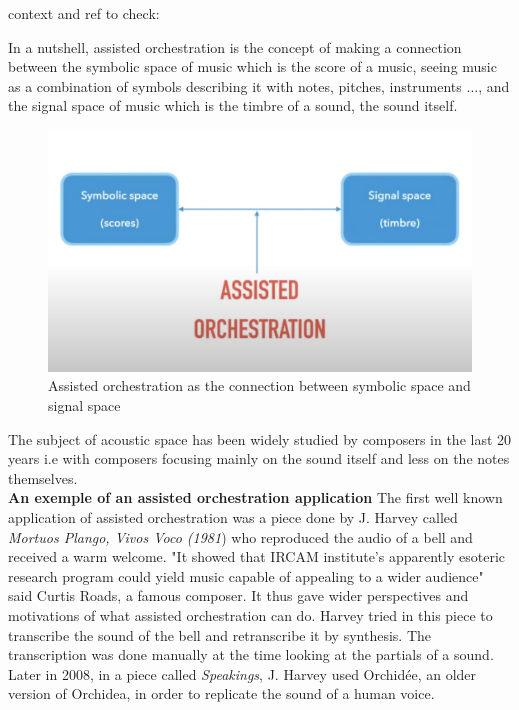 \documentclass[a4paper]{book}
\begin{document}
context and ref to check: \cite{maresz2013computer}

In a nutshell, assisted orchestration is the concept of making a connection between the symbolic space of music which is the score of a music, seeing music as a combination of symbols describing it with notes, pitches, instruments $\ldots$, and the signal space of music which is the timbre of a sound, the sound itself. 

\begin{figure}[h!]
\centering
\includegraphics[scale=0.3]{assistedorch.png}
\caption{Assisted orchestration as the connection between symbolic space and signal space}
\label{figassistedorch}
\end{figure}

The subject of acoustic space has been widely studied by composers in the last 20 years i.e with composers focusing mainly on the sound itself and less on the notes themselves.  \\

\textbf{An exemple of an assisted orchestration application }
The first well known application of assisted orchestration was a piece done by J. Harvey called \textit{Mortuos Plango, Vivos Voco (1981}) who reproduced the audio of a bell and received a warm welcome. "It showed that IRCAM institute's apparently esoteric research program could yield music capable of appealing to a wider audience" said Curtis Roads, a famous composer. It thus gave wider perspectives and motivations of what assisted orchestration can do. Harvey tried in this piece to transcribe the sound of the bell and retranscribe it by synthesis. The transcription was done manually at the time looking at the partials of a sound.\\
Later in 2008, in a piece called \textit{Speakings}, J. Harvey used Orchidée, an older version of Orchidea, in order to replicate the sound of a human voice.\\
\end{document}
